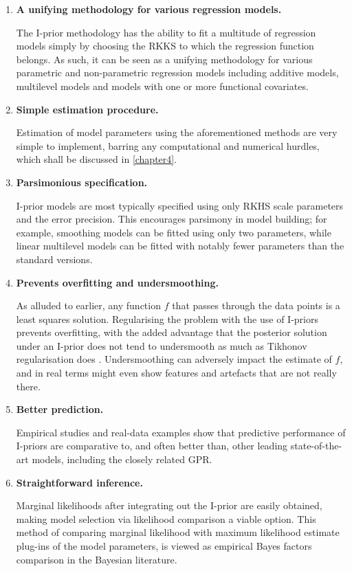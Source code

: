 \documentclass[11pt,twoside,openright,showframe]{report}
\begin{document}
\begin{enumerate}
  \item \textbf{A unifying methodology for various regression models.}
  
  The I-prior methodology has the ability to fit a multitude of regression models simply by choosing the RKKS to which the regression function belongs.
  As such, it can be seen as a unifying methodology for various parametric and non-parametric regression models including additive models, multilevel models and models with one or more functional covariates. 

  \item \textbf{Simple estimation procedure.}
  
  Estimation of model parameters using the aforementioned methods are very simple to implement, barring any computational and numerical hurdles, which shall be discussed in \cref{chapter4}.

  \item \textbf{Parsimonious specification.}
  
  I-prior models are most typically specified using only  RKHS scale parameters and the error precision.
  This encourages parsimony in model building; for example, smoothing models can be fitted using only two parameters, while linear multilevel models can be fitted with notably fewer parameters than the standard versions.
  
  \item \textbf{Prevents overfitting and undersmoothing.}
  
  As alluded to earlier, any function $f$ that passes through the data points is a least squares solution.
  Regularising the problem with the use of I-priors prevents overfitting, with the added advantage that the posterior solution under an I-prior does not tend to undersmooth as much as Tikhonov regularisation does \citep{bergsma2017}.
  Undersmoothing can adversely impact the estimate of $f$, and in real terms might even show features and artefacts that are not really there.
  
  \item \textbf{Better prediction.}
  
  Empirical studies and real-data examples show that predictive performance of I-priors are comparative to, and often better than, other leading state-of-the-art models, including the closely related GPR.

  \item \textbf{Straightforward inference.}
  
  Marginal likelihoods after integrating out the I-prior are easily obtained, making model selection via likelihood comparison a viable option.
  This method of comparing marginal likelihood with maximum likelihood estimate plug-ins of the model parameters, is viewed as empirical Bayes factors comparison in the Bayesian literature.
  
\end{enumerate}
\end{document}

